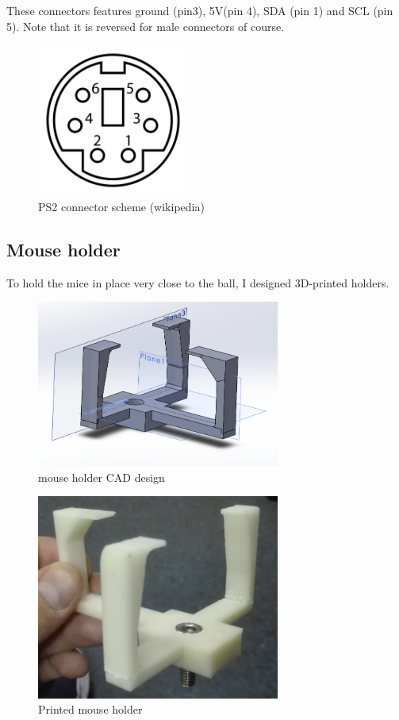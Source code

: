 \documentclass[a4paper]{article}
\begin{document}
These connectors features ground (pin3), 5V(pin 4), SDA (pin 1) and SCL (pin 5).
Note that it is reversed for male connectors of course.

\begin{figure}[h!]
    \centering
    \includegraphics[width = 5cm]{images/PS2.png}
    \caption{PS2 connector scheme (wikipedia)}
    \label{fig:PS2}
\end{figure}



\subsection{Mouse holder}
To hold the mice in place very close to the ball, I designed 3D-printed holders.

\begin{figure}[h!]
    \centering
    \includegraphics[width = 8cm]{images/cad1.png}
    \caption{mouse holder CAD design}
    \label{fig:cad1}
\end{figure}

\begin{figure}[h!]
    \centering
    \includegraphics[width = 8cm]{images/cad2.jpg}
    \caption{Printed mouse holder}
    \label{fig:cad2}
\end{figure}
\end{document}
